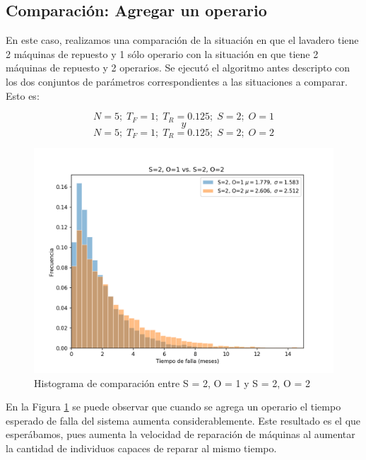 \pagebreak

    \subsection{Comparación: Agregar un operario}

    \par En este caso, realizamos una comparación de la situación en que el lavadero
    tiene 2 máquinas de repuesto y 1 sólo operario con la situación en que tiene 2
    máquinas de repuesto y 2 operarios.
    Se ejecutó el algoritmo antes descripto con los dos conjuntos de parámetros
    correspondientes a las situaciones a comparar. Esto es:

    \[
      N = 5; \; T_F = 1; \; T_R = 0.125; \; S = 2; \; O = 1
    \]
    \[y\]
    \[
      N = 5; \; T_F = 1; \; T_R = 0.125; \; S = 2; \; O = 2
    \]

    \begin{figure}[h]
        \centering
        \includegraphics[scale=0.8]{images/S2O1vsS2O2.png}
        \caption{Histograma de comparación entre S = 2, O = 1 y S = 2, O = 2}
        \label{fig:S2O1vsS2O2}
    \end{figure}
    \vspace{5mm}

    \par En la Figura \ref{fig:S2O1vsS2O2} se puede observar que cuando se agrega un
    operario el tiempo esperado de falla
    del sistema aumenta considerablemente. Este resultado es el que esperábamos, pues
    aumenta la velocidad de reparación de máquinas al aumentar la cantidad de individuos
    capaces de reparar al mismo tiempo.

